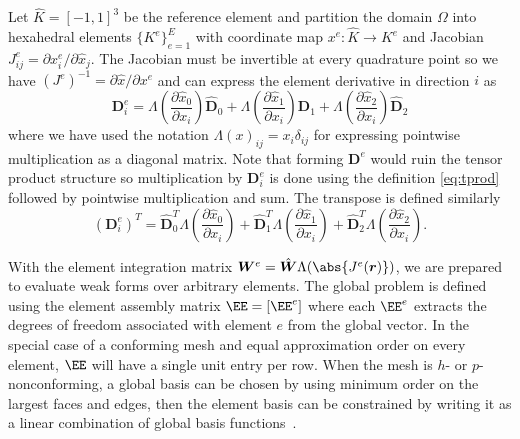 Let $\hat K = [-1,1]^3$ be the reference element and partition the domain $\Omega$ into hexahedral elements
$\{K^e\}_{e=1}^E$ with coordinate map $x^e : \hat K \to K^e$ and Jacobian $J^e_{ij} = \partial x_i^e/\partial \hat x_j$.
The Jacobian must be invertible at every quadrature point so we have $(J^e)^{-1} = \partial \hat x/\partial x^e$ and can
express the element derivative in direction $i$ as
\begin{equation*}
  \bm D^e_i = \Lambda\left(\frac{\partial \hat x_0}{\partial x_i}\right) \hat{\bm D}_0
  + \Lambda\left(\frac{\partial \hat x_1}{\partial x_i}\right) \hat{\bm D}_1
  + \Lambda\left(\frac{\partial \hat x_2}{\partial x_i}\right) \hat{\bm D}_2
\end{equation*}
where we have used the notation $\Lambda(x)_{ij} = x_i \delta_{ij}$ for expressing pointwise multiplication as a
diagonal matrix.  Note that forming $\bm D^e$ would ruin the tensor product structure so multiplication by $\bm D^e_i$
is done using the definition \eqref{eq:tprod} followed by pointwise multiplication and sum.  The transpose is defined
similarly
\begin{equation*}
  (\bm D^e_i)^T = \hat{\bm D}_0^T \Lambda\left(\frac{\partial \hat x_0}{\partial x_i}\right)
  + \hat{\bm D}_1^T \Lambda\left(\frac{\partial \hat x_1}{\partial x_i}\right)
  + \hat{\bm D}_2^T \Lambda\left(\frac{\partial \hat x_2}{\partial x_i}\right) .
\end{equation*}

With the element integration matrix $\bm W^e = \hat{\bm W} \Lambda(\abs{J^e(\bm r)})$, we are prepared to evaluate weak
forms over arbitrary elements.  The global problem is defined using the element assembly matrix $\EE = [\EE^e]$ where
each $\EE^e$ extracts the degrees of freedom associated with element $e$ from the global vector.  In the special case of
a conforming mesh and equal approximation order on every element, $\EE$ will have a single unit entry per row.  When the
mesh is $h$- or $p$-nonconforming, a global basis can be chosen by using minimum order on the largest faces and edges,
then the element basis can be constrained by writing it as a linear combination of global basis
functions~\citep{demkowicz1989tuh}.

